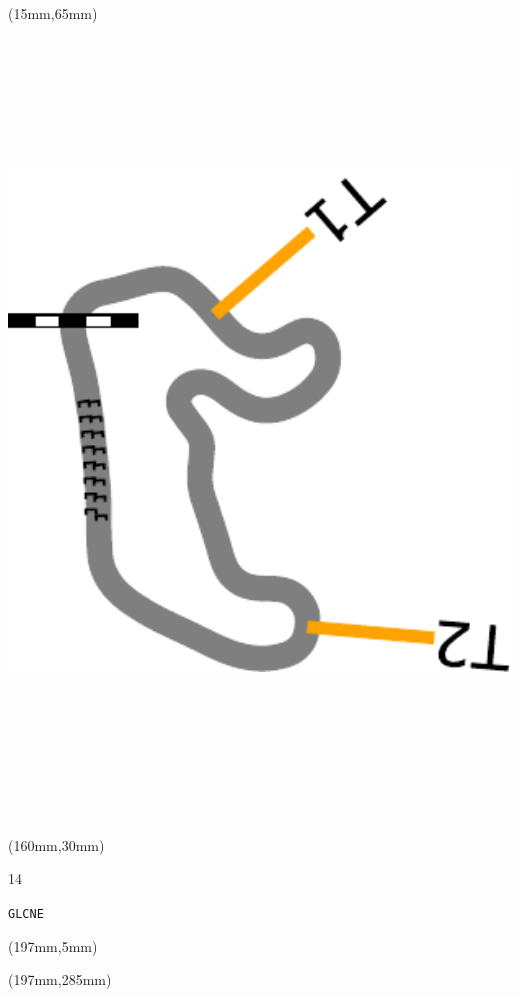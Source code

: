 \begin{textblock*}{185mm}(15mm,65mm)%
\centering
\mbox{\includegraphics[width=185mm,height=210mm,keepaspectratio]{PT/GLCNE.pdf}}
\end{textblock*}
\begin{textblock*}{40mm}(160mm,30mm)%
\Large
\par{} 
\par14 
\par\hfill\tiny\tt GLCNE\\
\end{textblock*}
\begin{textblock*}{20mm}(197mm,5mm)%
\fbox{\thepage}
\label{GLCNE}
\end{textblock*}
\begin{textblock*}{20mm}(197mm,285mm)%
\fbox{\thepage}
\end{textblock*}

